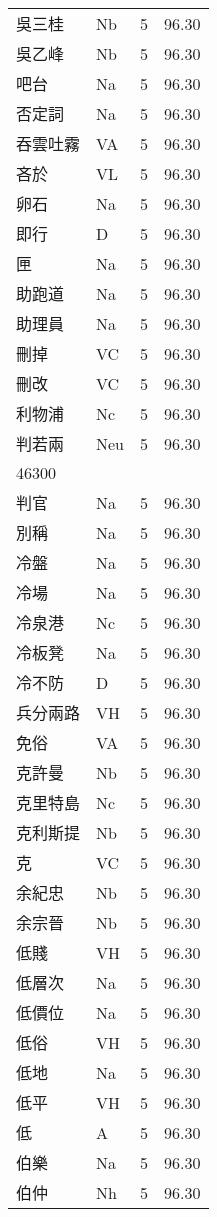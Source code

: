 \documentclass[twocolumn]{book}
\begin{document}
\begin{supertabular}{llrr}
吳三桂 & Nb & 5 &  96.30\\
吳乙峰 & Nb & 5 &  96.30\\
吧台 & Na & 5 &  96.30\\
否定詞 & Na & 5 &  96.30\\
吞雲吐霧 & VA & 5 &  96.30\\
吝於 & VL & 5 &  96.30\\
卵石 & Na & 5 &  96.30\\
即行 & D & 5 &  96.30\\
匣 & Na & 5 &  96.30\\
助跑道 & Na & 5 &  96.30\\
助理員 & Na & 5 &  96.30\\
刪掉 & VC & 5 &  96.30\\
刪改 & VC & 5 &  96.30\\
利物浦 & Nc & 5 &  96.30\\
判若兩 & Neu & 5 &  96.30\\
46300\\
判官 & Na & 5 &  96.30\\
別稱 & Na & 5 &  96.30\\
冷盤 & Na & 5 &  96.30\\
冷場 & Na & 5 &  96.30\\
冷泉港 & Nc & 5 &  96.30\\
冷板凳 & Na & 5 &  96.30\\
冷不防 & D & 5 &  96.30\\
兵分兩路 & VH & 5 &  96.30\\
免俗 & VA & 5 &  96.30\\
克許曼 & Nb & 5 &  96.30\\
克里特島 & Nc & 5 &  96.30\\
克利斯提 & Nb & 5 &  96.30\\
克 & VC & 5 &  96.30\\
余紀忠 & Nb & 5 &  96.30\\
余宗晉 & Nb & 5 &  96.30\\
低賤 & VH & 5 &  96.30\\
低層次 & Na & 5 &  96.30\\
低價位 & Na & 5 &  96.30\\
低俗 & VH & 5 &  96.30\\
低地 & Na & 5 &  96.30\\
低平 & VH & 5 &  96.30\\
低 & A & 5 &  96.30\\
伯樂 & Na & 5 &  96.30\\
伯仲 & Nh & 5 &  96.30\\

\end{supertabular}
\end{document}
